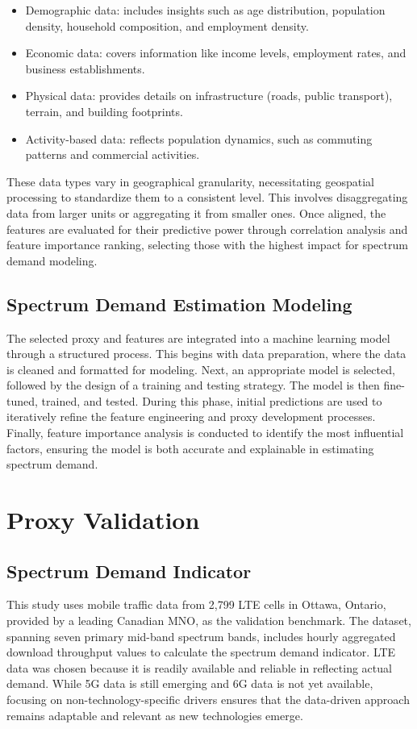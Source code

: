 \documentclass[conference]{IEEEtran}
\begin{document}
\begin{itemize}
    \item Demographic data: includes insights such as age distribution, population density, household composition, and employment density.
    \item Economic data: covers information like income levels, employment rates, and business establishments.
    \item Physical data: provides details on infrastructure (roads, public transport), terrain, and building footprints.
    \item Activity-based data: reflects population dynamics, such as commuting patterns and commercial activities.
\end{itemize}

These data types vary in geographical granularity, necessitating geospatial processing to standardize them to a consistent level. This involves disaggregating data from larger units or aggregating it from smaller ones. Once aligned, the features are evaluated for their predictive power through correlation analysis and feature importance ranking, selecting those with the highest impact for spectrum demand modeling.

\subsection{Spectrum Demand Estimation Modeling}
The selected proxy and features are integrated into a machine learning model through a structured process. This begins with data preparation, where the data is cleaned and formatted for modeling. Next, an appropriate model is selected, followed by the design of a training and testing strategy. The model is then fine-tuned, trained, and tested. During this phase, initial predictions are used to iteratively refine the feature engineering and proxy development processes. Finally, feature importance analysis is conducted to identify the most influential factors, ensuring the model is both accurate and explainable in estimating spectrum demand.


\section{Proxy Validation}\label{Proxy Validation}

\subsection{Spectrum Demand Indicator}
This study uses mobile traffic data from 2,799 LTE cells in Ottawa, Ontario, provided by a leading Canadian MNO, as the validation benchmark. The dataset, spanning seven primary mid-band spectrum bands, includes hourly aggregated download throughput values to calculate the spectrum demand indicator. LTE data was chosen because it is readily available and reliable in reflecting actual demand. While 5G data is still emerging and 6G data is not yet available, focusing on non-technology-specific drivers ensures that the data-driven approach remains adaptable and relevant as new technologies emerge.
\end{document}
